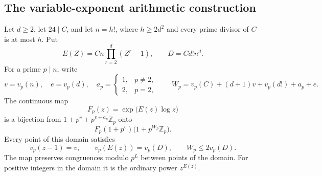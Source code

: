 \subsection{The variable-exponent arithmetic construction}

\begin{lemma}
\label{lem:ghost-variable-exponent-image}
Let \(d\ge2\), let \(24\mid C\), and let
\(n=h!\), where \(h\ge2d^2\) and every prime divisor
of \(C\) is at most \(h\). Put
\[
 E(Z)=Cn\prod_{r=2}^d(Z^r-1),\qquad D=Cd!n^d.
\]
For a prime \(p\mid n\), write
\[
 v=v_p(n),\quad e=v_p(d),\quad
 a_p=\begin{cases}1,&p\ne2,\\2,&p=2,\end{cases}
 \qquad
 W_p=v_p(C)+(d+1)v+v_p(d!)+a_p+e.
\]
The continuous map
\[
 F_p(z)=\exp\bigl(E(z)\log z\bigr)
\]
is a bijection from
\(1+p^v+p^{v+a_p}\mathbb Z_p\) onto
\[
 F_p(1+p^v)\bigl(1+p^{W_p}\mathbb Z_p\bigr).
 \tag{VX.1}
\]
Every point of this domain satisfies
\[
 v_p(z-1)=v,\qquad v_p(E(z))=v_p(D),
 \qquad W_p\le2v_p(D).
 \tag{VX.2}
\]
The map preserves congruences modulo \(p^L\) between
points of the domain. For positive integers in the domain
it is the ordinary power \(z^{E(z)}\).
\end{lemma}
